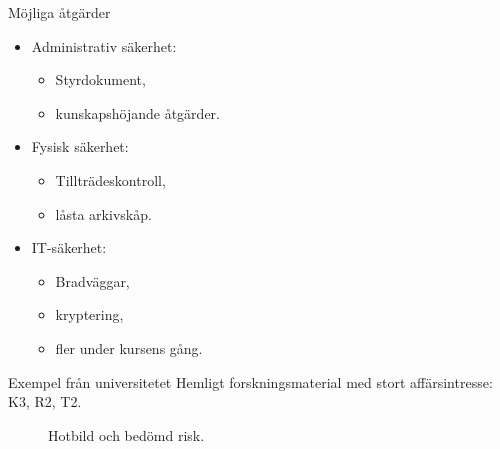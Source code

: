 \documentclass{beamer}
\begin{document}
\begin{frame}{Möjliga åtgärder}
  \begin{itemize}
    \item Administrativ säkerhet:
      \begin{itemize}
        \item Styrdokument,
        \item kunskapshöjande åtgärder.
      \end{itemize}
    \item Fysisk säkerhet:
      \begin{itemize}
        \item Tillträdeskontroll,
        \item låsta arkivskåp.
      \end{itemize}
    \item IT-säkerhet:
      \begin{itemize}
        \item Bradväggar,
        \item kryptering,
        \item fler under kursens gång.
      \end{itemize}
  \end{itemize}
\end{frame}

\begin{frame}{Exempel från universitetet}
  Hemligt forskningsmaterial med stort affärsintresse: K3, R2, T2.
  \begin{figure}
    \hfill
    \hfill
    \hfill
    \caption{Hotbild och bedömd risk.}
  \end{figure}
\end{frame}
\end{document}
